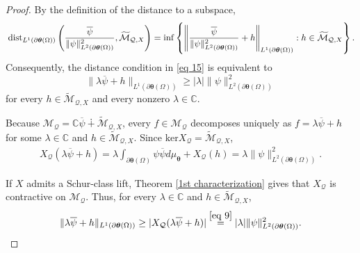 \documentclass[12pt,reqno]{amsart}
\theoremstyle{remark}
\theoremstyle{definition}
\newcommand{\beq}{\begin{eqnarray}}
\newcommand{\eeq}{\end{eqnarray}}
\newcommand{\dist}{{\rm\,dist}}
\begin{document}
\begin{proof}
    By the definition of the distance to a subspace, 
    $$ \dist_{L^1(\partial\boldsymbol\theta(\Omega))}\left( \frac{\overline{\psi}}{\|\psi\|^2_{L^2(\partial\boldsymbol\theta(\Omega))}}, \widetilde{\mathcal{M}}_{\mathcal{Q}, X}\right)=\inf \left\{\left\|\frac{\overline{\psi}}{\|\psi\|^2_{L^2(\partial\boldsymbol\theta(\Omega))}}+h\right\|_{L^1(\partial\boldsymbol\theta(\Omega))}: h\in \widetilde{\mathcal{M}}_{\mathcal{Q}, X} \right\}.$$ 
    Consequently, the distance condition in \eqref{eq 15} is equivalent to
   $$\|\lambda\overline{\psi}+h\|_{L^1(\partial\boldsymbol\theta(\Omega))} \geq |\lambda|\|\psi\|^2_{L^2(\partial\boldsymbol\theta(\Omega))}$$ for every $h \in \widetilde{\mathcal{M}}_{\mathcal{Q}, X}$ and every nonzero $\lambda \in \mathbb C.$
   
   Because $\mathcal{M}_{\mathcal{Q}} = \mathbb{C}\overline{\psi} \dotplus \widetilde{\mathcal{M}}_{\mathcal{Q}, X}$, every $f\in \mathcal{M}_{\mathcal Q}$ decomposes uniquely as $f = \lambda \overline{\psi} + h$ for some $\lambda\in\mathbb C$ and $h\in \widetilde{\mathcal{M}}_{\mathcal Q,X}$. Since $\mathrm{ker} X_{\mathcal{Q}}=\widetilde{\mathcal{M}}_{\mathcal Q,X}$,
\beq \label{eq 9} X_{\mathcal{Q}}(\lambda \overline{\psi} + h) = \lambda \int_{\partial\boldsymbol\theta(\Omega)} \psi \overline{\psi} d\mu_{\boldsymbol \theta} + X_{\mathcal{Q}}(h) = \lambda \|\psi\|^2_{L^2(\partial\boldsymbol\theta(\Omega))}. \eeq


If $X$ admits a Schur-class lift, Theorem \ref{1st characterization} gives that $X_{\mathcal{Q}}$ is contractive on $\mathcal{M}_{\mathcal{Q}}$. Thus, for every $\lambda \in \mathbb{C}$ and $h \in \widetilde{\mathcal{M}}_{\mathcal{Q}, X}$,
$$\|\lambda\overline{\psi} + h\|_{L^1(\partial\boldsymbol{\theta}(\Omega))} \geq |X_{\mathcal{Q}}(\lambda\overline{\psi} + h)| \overset{\eqref{eq 9}}{=} |\lambda| \|\psi\|^2_{L^2(\partial\boldsymbol{\theta}(\Omega))}.$$



\end{proof}
\end{document}
